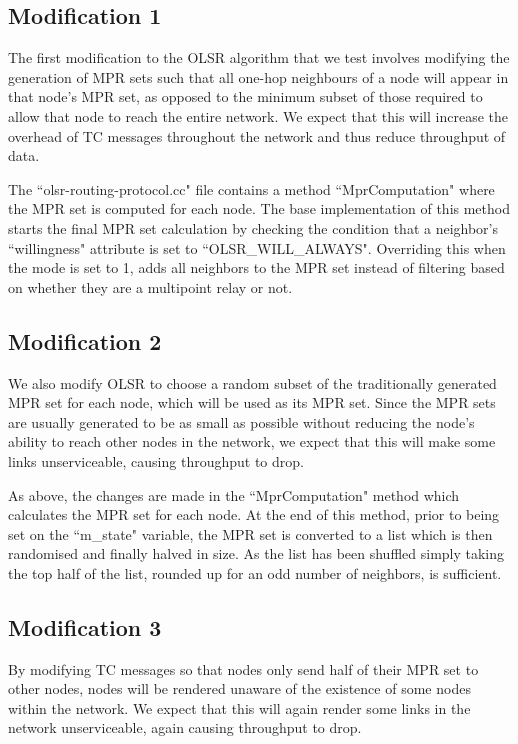 \documentclass[12pt,a4paper]{article}
\begin{document}
\subsection{Modification 1}
The first modification to the OLSR algorithm that we test involves modifying the generation of MPR sets such that all one-hop neighbours of a node will appear in that node's MPR set, as opposed to the minimum subset of those required to allow that node to reach the entire network. We expect that this will increase the overhead of TC messages throughout the network and thus reduce throughput of data. 

The ``olsr-routing-protocol.cc" file contains a method ``MprComputation" where the MPR set is computed for each node. The base implementation of this method starts the final MPR set calculation by checking the condition that a neighbor's ``willingness" attribute is set to ``OLSR_WILL_ALWAYS". Overriding this when the mode is set to 1, adds all neighbors to the MPR set instead of filtering based on whether they are a multipoint relay or not. 

\subsection{Modification 2}
We also modify OLSR to choose a random subset of the traditionally generated MPR set for each node, which will be used as its MPR set. Since the MPR sets are usually generated to be as small as possible without reducing the node's ability to reach other nodes in the network, we expect that this will make some links unserviceable, causing throughput to drop.

As above, the changes are made in the ``MprComputation" method which calculates the MPR set for each node. At the end of this method, prior to being set on the ``m_state" variable, the MPR set is converted to a list which is then randomised and finally halved in size. As the list has been shuffled simply taking the top half of the list, rounded up for an odd number of neighbors, is sufficient.

\subsection{Modification 3}
By modifying TC messages so that nodes only send half of their MPR set to other nodes, nodes will be rendered unaware of the existence of some nodes within the network. We expect that this will again render some links in the network unserviceable, again causing throughput to drop.
\end{document}
